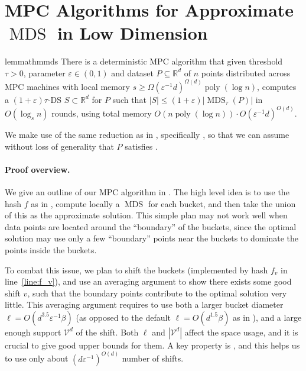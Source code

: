 \documentclass[11pt,letterpaper]{article}
\theoremstyle{plain}
\theoremstyle{definition}
\theoremstyle{remark}
\DeclareMathOperator{\poly}{poly}
\DeclareMathOperator{\MDS}{MDS}
\renewcommand{\epsilon}{\ensuremath{\varepsilon}}
\let\epsilon\varepsilon
\begin{document}
 
    \section{MPC Algorithms for Approximate $\MDS$ in Low Dimension}
\label{sec:mds}


\begin{restatable}{lemma}{thmmds}
    \label{thm:mds} 
    There is a deterministic MPC algorithm that given threshold $\tau > 0$,  parameter $\varepsilon\in(0,1)$ and dataset $P\subseteq \mathbb{R}^d$ of $n$ points distributed across MPC machines with local memory $s\geq \Omega(\varepsilon^{-1}d)^{\Omega(d)}\poly(\log n)$, 
computes a $(1 + \epsilon)\tau$-DS $S \subset \mathbb{R}^{d}$ for $P$ such that $|S| \leq (1 + \epsilon) |\MDS_{\tau}(P)|$ in $O(\log_{s}n)$ rounds, using total memory $O(n \poly(\log n))\cdot O(\varepsilon^{-1}d)^{O(d)}$. 
\end{restatable}
We make use of the same reduction as in , specifically ,
so that we can assume without loss of generality that $P$ satisfies .













\paragraph{Proof overview.}
We give an outline of our MPC algorithm in . 
The high level idea is to use the hash $f$ as in ,
compute locally a $\MDS$ for each bucket, and then take the union of this as the approximate solution.
This simple plan may not work well when data points are located around the ``boundary'' of the buckets,
since the optimal solution may use only a few ``boundary'' points near the buckets to dominate the points inside the buckets.

To combat this issue, we plan to shift the buckets (implemented by hash $f_v$ in line~\ref{line:f_v}),
and use an averaging argument to show there exists some good shift $v$,
such that the boundary points contribute to the optimal solution very little.
This averaging argument requires to use both a larger bucket diameter
$\ell = O(d^{3.5}\epsilon^{-1} \beta)$ (as opposed to the default $\ell = O(d^{1.5} \beta)$ as in ),
and a large enough support $\mathcal{V}^d$ of the shift.
Both $\ell$ and $|\mathcal{V}^d|$ affect the space usage, and it is crucial to give good upper bounds for them.
A key property is , and this helps us to use only about $(d\epsilon^{-1})^{O(d)}$ number of shifts.
\end{document}
